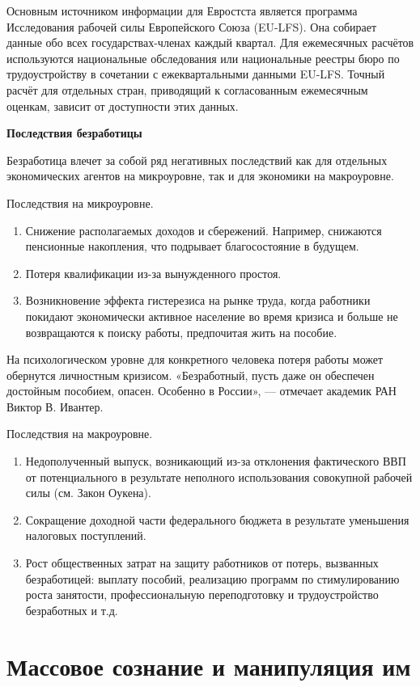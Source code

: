 Основным источником информации для Евростста является программа Исследования рабочей силы Европейского Союза (EU-LFS). Она собирает данные обо всех государствах-членах каждый квартал. Для ежемесячных расчётов используются национальные обследования или национальные реестры бюро по трудоустройству в сочетании с ежеквартальными данными EU-LFS. Точный расчёт для отдельных стран, приводящий к согласованным ежемесячным оценкам, зависит от доступности этих данных.

\textbf{Последствия безработицы}

Безработица влечет за собой ряд негативных последствий как для отдельных экономических агентов на микроуровне, так и для экономики на макроуровне.

Последствия на микроуровне.
\begin{enumerate}
    \item Снижение располагаемых доходов и сбережений. Например, снижаются пенсионные накопления, что подрывает благосостояние в будущем.
    \item Потеря квалификации из-за вынужденного простоя.
    \item Возникновение эффекта гистерезиса на рынке труда, когда работники покидают экономически активное население во время кризиса и больше не возвращаются к поиску работы, предпочитая жить на пособие.
\end{enumerate}
На психологическом уровне для конкретного человека потеря работы может обернутся личностным кризисом. «Безработный, пусть даже он обеспечен достойным пособием, опасен. Особенно в России», — отмечает академик РАН Виктор В. Ивантер.

Последствия на макроуровне.
\begin{enumerate}
    \item Недополученный выпуск, возникающий из-за отклонения фактического ВВП от потенциального в результате неполного использования совокупной рабочей силы (см. Закон Оукена).
    \item Сокращение доходной части федерального бюджета в результате уменьшения налоговых поступлений.
    \item Рост общественных затрат на защиту работников от потерь, вызванных безработицей: выплату пособий, реализацию программ по стимулированию роста занятости, профессиональную переподготовку и трудоустройство безработных и т.д.
\end{enumerate}

\newpage
\section{Массовое сознание и манипуляция им}

